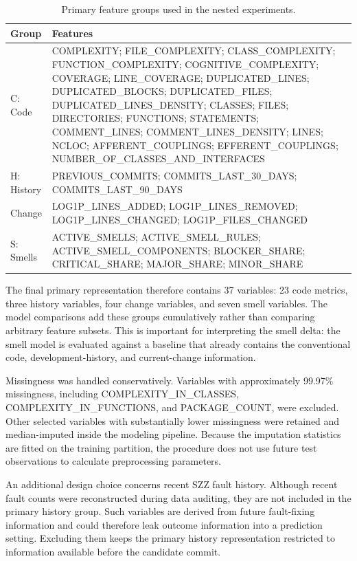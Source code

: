 \documentclass[conference]{IEEEtran}
\begin{document}
\begin{table}[t]
\centering
\caption{Primary feature groups used in the nested experiments.}
\label{tab:features}
\scriptsize
\begin{tabular}{p{2.0cm}p{11.8cm}}
\toprule
Group & Features\\
\midrule
C: Code & COMPLEXITY; FILE\_COMPLEXITY; CLASS\_COMPLEXITY; FUNCTION\_COMPLEXITY; COGNITIVE\_COMPLEXITY; COVERAGE; LINE\_COVERAGE; DUPLICATED\_LINES; DUPLICATED\_BLOCKS; DUPLICATED\_FILES; DUPLICATED\_LINES\_DENSITY; CLASSES; FILES; DIRECTORIES; FUNCTIONS; STATEMENTS; COMMENT\_LINES; COMMENT\_LINES\_DENSITY; LINES; NCLOC; AFFERENT\_COUPLINGS; EFFERENT\_COUPLINGS; NUMBER\_OF\_CLASSES\_AND\_INTERFACES\\
H: History & PREVIOUS\_COMMITS; COMMITS\_LAST\_30\_DAYS; COMMITS\_LAST\_90\_DAYS\\
Change & LOG1P\_LINES\_ADDED; LOG1P\_LINES\_REMOVED; LOG1P\_LINES\_CHANGED; LOG1P\_FILES\_CHANGED\\
S: Smells & ACTIVE\_SMELLS; ACTIVE\_SMELL\_RULES; ACTIVE\_SMELL\_COMPONENTS; BLOCKER\_SHARE; CRITICAL\_SHARE; MAJOR\_SHARE; MINOR\_SHARE\\
\bottomrule
\end{tabular}
\end{table}

The final primary representation therefore contains 37 variables: 23 code metrics, three history variables, four change variables, and seven smell variables. The model comparisons add these groups cumulatively rather than comparing arbitrary feature subsets. This is important for interpreting the smell delta: the smell model is evaluated against a baseline that already contains the conventional code, development-history, and current-change information.

Missingness was handled conservatively. Variables with approximately 99.97\% missingness, including COMPLEXITY\_IN\_CLASSES, COMPLEXITY\_IN\_FUNCTIONS, and PACKAGE\_COUNT, were excluded. Other selected variables with substantially lower missingness were retained and median-imputed inside the modeling pipeline. Because the imputation statistics are fitted on the training partition, the procedure does not use future test observations to calculate preprocessing parameters.

An additional design choice concerns recent SZZ fault history. Although recent fault counts were reconstructed during data auditing, they are not included in the primary history group. Such variables are derived from future fault-fixing information and could therefore leak outcome information into a prediction setting. Excluding them keeps the primary history representation restricted to information available before the candidate commit.
\end{document}
